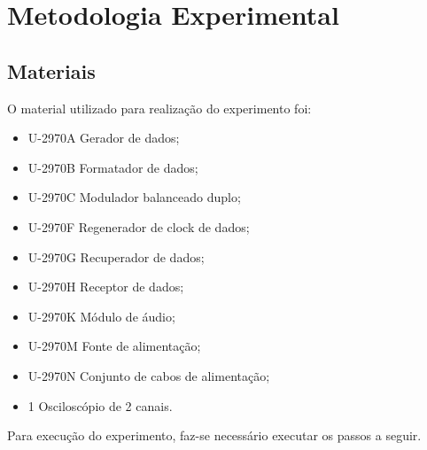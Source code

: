 \newpage
\section{Metodologia Experimental}

    \subsection{Materiais}
        O material utilizado para realização do experimento foi:

        \begin{itemize}
            \item U-2970A Gerador de dados;
            \item U-2970B Formatador de dados;
            \item U-2970C Modulador balanceado duplo;
            \item U-2970F Regenerador de clock de dados;
            \item U-2970G Recuperador de dados;
            \item U-2970H Receptor de dados;
            \item U-2970K Módulo de áudio;
            \item U-2970M Fonte de alimentação;
            \item U-2970N Conjunto de cabos de alimentação;
            \item 1 Osciloscópio de 2 canais.
        \end{itemize}

        Para execução do experimento, faz-se necessário executar os passos a seguir.

    
